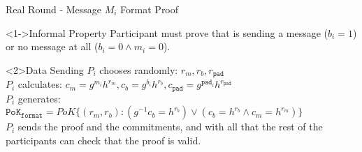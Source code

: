 \begin{frame}{Real Round - Message $M_i$ Format Proof}
    \begin{block}<1->{Informal Property}
        Participant must prove that is sending a message ($b_i = 1$) or no message at all ($b_i = 0 \land m_i = 0$). 
    \end{block}
    \begin{block}<2>{Data Sending}
        $P_i$ chooses randomly: $r_m, r_b, r_{\mathtt{pad}}$\\
        $P_i$ calculates: $c_m = g^{m_i} h^{r_m}, c_b = g^{b_i} h^{r_b}, c_{\mathtt{pad}} = g^{\mathtt{pad}_i} h^{r_{\mathtt{pad}}}$\\
        $P_i$ generates: $\mathtt{PoK}_{\mathtt{format}} = PoK\{(r_m, r_b): (g^{-1} c_b = h^{r_b}) \lor (c_b = h^{r_b} \land c_m = h^{r_m})\}$\\
        $P_i$ sends the proof and the commitments, and with all that the rest of the participants can check that the proof is valid.
    \end{block}
\end{frame}